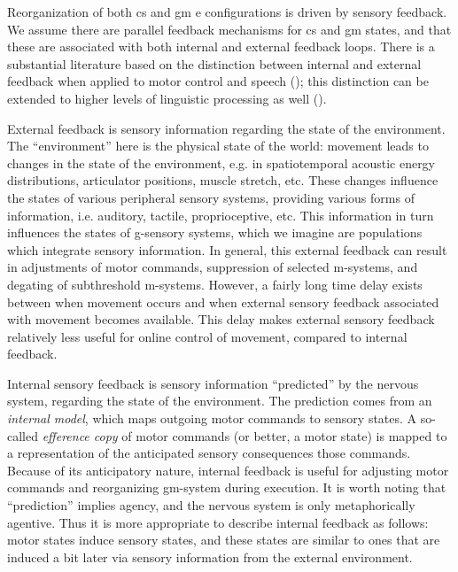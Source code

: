 Reorganization of both cs and gm e configurations is driven by sensory feedback. We assume there are parallel feedback mechanisms for cs and gm states, and that these are associated with both internal and external feedback loops. There is a substantial literature based on the distinction between internal and external feedback when applied to motor control and speech (\citealt{Hickok2012,Kawato1999,MiallWolpert1996,RamanarayananEtAl2016,WolpertEtAl1995,WolpertKawato1998}); this distinction can be extended to higher levels of linguistic processing as well (\citealt{HagoortLevelt2009,Laver1973,Levelt1983,Levelt1989,Nooteboom1973,NooteboomQuené2008,Postma2000}).

  External feedback is sensory information regarding the state of the environment. The “environment” here is the physical state of the world: movement leads to changes in the state of the environment, e.g. in spatiotemporal acoustic energy distributions, articulator positions, muscle stretch, etc. These changes influence the states of various peripheral sensory systems, providing various forms of information, i.e. auditory, tactile, proprioceptive, etc. This information in turn influences the states of g-sensory systems, which we imagine are populations which integrate sensory information. In general, this external feedback can result in adjustments of motor commands, suppression of selected m-systems, and degating of subthreshold m-systems. However, a fairly long time delay exists between when movement occurs and when external sensory feedback associated with movement becomes available. This delay makes external sensory feedback relatively less useful for online control of movement, compared to internal feedback. 

  Internal sensory feedback is sensory information “predicted” by the nervous system, regarding the state of the environment. The prediction comes from an \textit{internal model}, which maps outgoing motor commands to sensory states. A so-called \textit{efference copy} of motor commands (or better, a motor state) is mapped to a representation of the anticipated sensory consequences those commands. Because of its anticipatory nature, internal feedback is useful for adjusting motor commands and reorganizing gm-system during execution. It is worth noting that “prediction” implies agency, and the nervous system is only metaphorically agentive. Thus it is more appropriate to describe internal feedback as follows: motor states induce sensory states, and these states are similar to ones that are induced a bit later via sensory information from the external environment.

